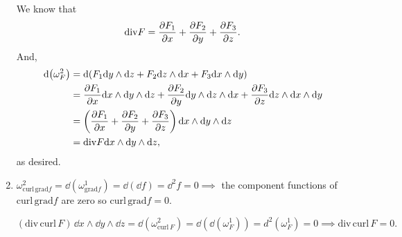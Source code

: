 \documentclass{exam}
\numberwithin{equation}{section}
\begin{document}
\begin{enumerate}[label=\alph*)]
        We know that \[\mathrm{div} F=\partialderivative{F_1}{x}+\partialderivative{F_2}{y}+\partialderivative{F_3}{z}.\]
        And,
        \begin{align*}
            \dd(\omega_F^2)&=\dd(F_1\dd y\wedge\dd z+F_2\dd z\wedge\dd x+F_3\dd x\wedge\dd y)\\
            &=\partialderivative{F_1}{x}\dd x\wedge\dd y\wedge\dd z+\partialderivative{F_2}{y}\dd y\wedge\dd z\wedge\dd x+\partialderivative{F_3}{z}\dd z\wedge\dd x\wedge\dd y\\
            &=\left(\partialderivative{F_1}{x}+\partialderivative{F_2}{y}+\partialderivative{F_3}{z}\right)\dd x\wedge\dd y\wedge \dd z\\
            &=\mathrm{div}F\dd x\wedge\dd y\wedge\dd z,
        \end{align*}
        as desired.

        \item \(\omega_{\mathrm{curl\,grad}f}^2=\dd(\omega_{\mathrm{grad}f}^1)=\dd(\dd f)=\dd^2f=0\implies\) the component functions of \(\mathrm{curl\,grad}f\) are zero so \(\mathrm{curl\,grad}f=0.\)
        
        \((\mathrm{div\,curl}\,F)\,\dd x\wedge\dd y\wedge\dd z=\dd(\omega_{\mathrm{curl}\,F}^2)=\dd(\dd(\omega_F^1))=d^2(\omega_F^1)=0\implies\mathrm{div\,curl}\,F=0.\)

    \end{enumerate}
\end{document}

